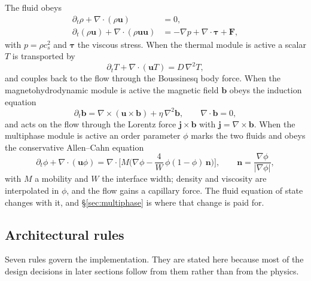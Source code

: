 \documentclass[11pt,a4paper]{article}
\newcommand{\cs}{c_s}
\newcommand{\uu}{\bm{u}}
\newcommand{\bb}{\bm{b}}
\newcommand{\nn}{\bm{n}}
\begin{document}
The fluid obeys
\begin{align}
  \partial_t \rho + \nabla\!\cdot(\rho\uu) &= 0, \\
  \partial_t(\rho\uu) + \nabla\!\cdot(\rho\uu\uu)
     &= -\nabla p + \nabla\!\cdot\bm{\tau} + \bm{F},
\end{align}
with $p=\rho\cs^2$ and $\bm{\tau}$ the viscous stress. When the thermal module is
active a scalar $T$ is transported by
\begin{equation}
  \partial_t T + \nabla\!\cdot(\uu T) = D\,\nabla^2 T ,
\end{equation}
and couples back to the flow through the Boussinesq body force. When the
magnetohydrodynamic module is active the magnetic field $\bb$ obeys the induction
equation
\begin{equation}
  \partial_t \bb = \nabla\times(\uu\times\bb) + \eta\,\nabla^2\bb,
  \qquad \nabla\!\cdot\bb = 0,
  \label{eq:induction}
\end{equation}
and acts on the flow through the Lorentz force $\bm{j}\times\bb$ with
$\bm{j}=\nabla\times\bb$. When the multiphase module is active an order
parameter $\phi$ marks the two fluids and obeys the conservative Allen--Cahn
equation
\begin{equation}
  \partial_t \phi + \nabla\!\cdot(\uu\phi)
    = \nabla\!\cdot\!\Big[ M\Big(\nabla\phi
      - \frac{4}{W}\,\phi(1-\phi)\,\nn\Big)\Big],
  \qquad \nn = \frac{\nabla\phi}{|\nabla\phi|},
  \label{eq:ace}
\end{equation}
with $M$ a mobility and $W$ the interface width; density and viscosity are
interpolated in $\phi$, and the flow gains a capillary force. The fluid equation
of state changes with it, and \S\ref{sec:multiphase} is where that change is
paid for.

\subsection{Architectural rules}
\label{sec:rules}

Seven rules govern the implementation. They are stated here because most of the
design decisions in later sections follow from them rather than from the physics.
\end{document}
